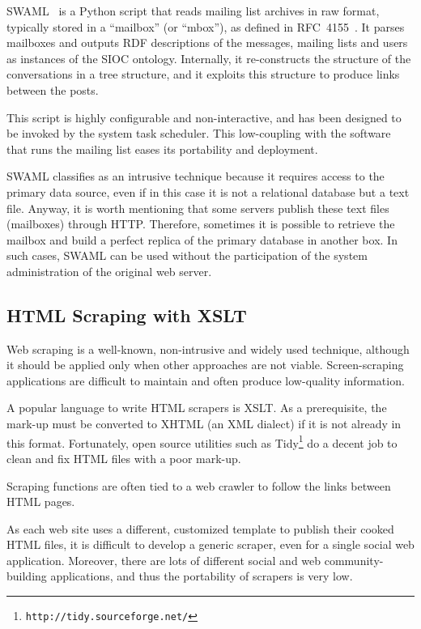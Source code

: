 \documentclass{../templates/www2008-submission}
\begin{document}
SWAML~\cite{SWAML2007} is a Python script that reads mailing 
list archives in raw format, typically stored in a ``mailbox'' 
(or ``mbox''), as defined in RFC~4155~\cite{RFC4155}. It parses
mailboxes and outputs RDF descriptions of the messages, mailing lists
and users as instances of the SIOC ontology. Internally, it re-constructs
the structure of the conversations in a tree structure, and it exploits
this structure to produce links between the posts.

This script is highly configurable and non-interactive, and has been
designed to be invoked by the system task scheduler. This low-coupling with
the software that runs the mailing list eases its portability and
deployment.

SWAML classifies as an intrusive technique because
it requires access to the primary data source, even if in this case
it is not a relational database but a text file. Anyway, it is
worth mentioning that some servers publish these text files
(mailboxes) through HTTP. Therefore, sometimes it is possible to
retrieve the mailbox and build a perfect replica of the primary
database in another box. In such cases, SWAML can be used without the
participation of the system administration of the original
web server.

\subsection{HTML Scraping with XSLT}

Web scraping is a well-known, non-intrusive and widely used technique,
although it should be applied only when other approaches are not viable.
Screen-scraping applications are difficult to maintain and
often produce low-quality information.

A popular language to write HTML scrapers is XSLT. As a prerequisite,
the mark-up must be converted to XHTML (an XML dialect) if it is not
already in this format. Fortunately, open source utilities such as
Tidy\footnote{\texttt{http://tidy.sourceforge.net/}} do a decent job
to clean and fix HTML files with a poor mark-up.

Scraping functions are often tied to a web crawler to follow the
links between HTML pages.

As each web site uses a different, customized template to
publish their cooked HTML files, it is
difficult to develop a generic scraper, even for a single social
web application. Moreover, there are lots of different social and
web community-building applications, and thus the portability of scrapers
is very low.
\end{document}
